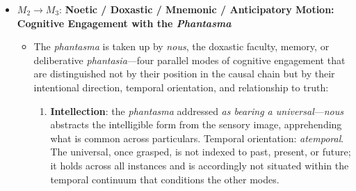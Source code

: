 \begin{itemize}
\begin{itemize}
          \item $M_2 \rightarrow M_3$: \textbf{Noetic / Doxastic / Mnemonic / Anticipatory
          Motion: Cognitive Engagement with the \textit{Phantasma}}
          \begin{itemize}
              \item The \textit{phantasma} is taken up by \textit{nous}, the doxastic
              faculty, memory, or deliberative \textit{phantasia}---four parallel
              modes of cognitive engagement that are distinguished not by their
              position in the causal chain but by their intentional direction,
              temporal orientation, and relationship to truth:
              \begin{enumerate}
                  \item \textbf{Intellection}: the \textit{phantasma} addressed
                  \textit{as bearing a universal}---\textit{nous} abstracts the
                  intelligible form from the sensory image, apprehending what is
                  common across particulars. Temporal orientation: \textit{atemporal}.
                  The universal, once grasped, is not indexed to past, present, or
                  future; it holds across all instances and is accordingly not
                  situated within the temporal continuum that conditions the other
                  modes.


\end{enumerate}
\end{itemize}
\end{itemize}
\end{itemize}
